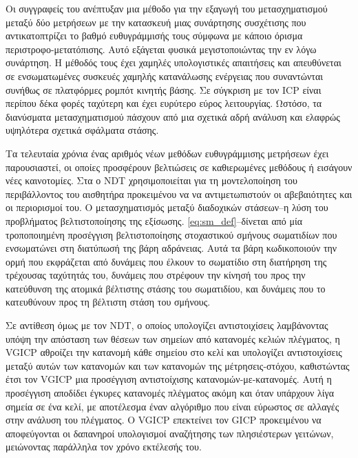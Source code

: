 Οι συγγραφείς του \cite{Konecny2016} ανέπτυξαν μια μέθοδο για την εξαγωγή του
μετασχηματισμού μεταξύ δύο μετρήσεων με την κατασκευή μιας συνάρτησης
συσχέτισης που αντικατοπτρίζει το βαθμό ευθυγράμμισής τους σύμφωνα με κάποιο
όρισμα περιστροφο-μετατόπισης. Αυτό εξάγεται φυσικά μεγιστοποιώντας την εν λόγω
συνάρτηση. Η μέθοδός τους έχει χαμηλές υπολογιστικές απαιτήσεις και απευθύνεται
σε ενσωματωμένες συσκευές χαμηλής κατανάλωσης ενέργειας που συναντώνται συνήθως
σε πλατφόρμες ρομπότ κινητής βάσης.  Σε σύγκριση με τον ICP είναι περίπου δέκα
φορές ταχύτερη και έχει ευρύτερο εύρος λειτουργίας. Ωστόσο, τα διανύσματα
μετασχηματισμού πάσχουν από μια σχετικά αδρή ανάλυση και ελαφρώς υψηλότερα
σχετικά σφάλματα στάσης.

Τα τελευταία χρόνια ένας αριθμός νέων μεθόδων ευθυγράμμισης μετρήσεων έχει
παρουσιαστεί, οι οποίες προσφέρουν βελτιώσεις σε καθιερωμένες μεθόδους ή
εισάγουν νέες καινοτομίες.  Στα  \cite{Bouraine2020a,Bouraine2021} ο NDT
χρησιμοποιείται για τη μοντελοποίηση του περιβάλλοντος του αισθητήρα
προκειμένου να να αντιμετωπιστούν οι αβεβαιότητες και οι περιορισμοί του. Ο
μετασχηματισμός μεταξύ διαδοχικών στάσεων--η λύση του προβλήματος
βελτιστοποίησης της εξίσωσης.  \ref{eq:sm_def}--δίνεται από μία τροποποιημένη
προσέγγιση βελτιστοποίησης στοχαστικού σμήνους σωματιδίων που ενσωματώνει στη
διατύπωσή της βάρη αδράνειας. Αυτά τα βάρη κωδικοποιούν την ορμή που εκφράζεται
από δυνάμεις που έλκουν το σωματίδιο στη διατήρηση της τρέχουσας ταχύτητάς του,
δυνάμεις που στρέφουν την κίνησή του προς την κατεύθυνση της ατομικά βέλτιστης
στάσης του σωματιδίου, και δυνάμεις που το κατευθύνουν προς τη βέλτιστη στάση
του σμήνους.

Σε αντίθεση όμως με τον NDT, ο οποίος υπολογίζει αντιστοιχίσεις λαμβάνοντας
υπόψη την απόσταση των θέσεων των σημείων από κατανομές κελιών πλέγματος, η
VGICP \cite{Koide2021a} αθροίζει την κατανομή κάθε σημείου στο κελί και
υπολογίζει αντιστοιχίσεις μεταξύ αυτών των κατανομών και των κατανομών της
μέτρησεις-στόχου, καθιστώντας έτσι τον VGICP μια προσέγγιση αντιστοίχισης
κατανομών-με-κατανομές. Αυτή η προσέγγιση αποδίδει έγκυρες κατανομές πλέγματος
ακόμη και όταν υπάρχουν λίγα σημεία σε ένα κελί, με αποτέλεσμα έναν αλγόριθμο
που είναι εύρωστος σε αλλαγές στην ανάλυση του πλέγματος. Ο VGICP επεκτείνει
τον GICP \cite{Segal2009a} προκειμένου να αποφεύγονται οι δαπανηροί υπολογισμοί
αναζήτησης των πλησιέστερων γειτώνων, μειώνοντας παράλληλα τον χρόνο εκτέλεσής
του.

